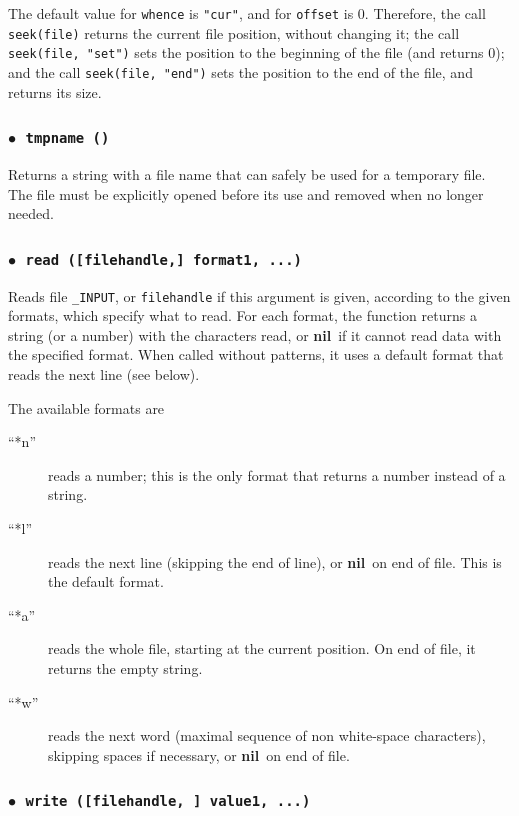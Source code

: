 \documentclass[11pt]{article}
\newcommand{\T}[1]{{\tt #1}}
\newcommand{\nil}{{\bf nil}}
\newcommand{\Deffunc}[1]{\index{#1}}
\newcommand{\ff}{$\bullet$\ }
\begin{document}
The default value for \verb|whence| is \verb|"cur"|,
and for \verb|offset| is 0.
Therefore, the call \verb|seek(file)| returns the current
file position, without changing it;
the call \verb|seek(file, "set")| sets the position to the
beginning of the file (and returns 0);
and the call \verb|seek(file, "end")| sets the position to the
end of the file, and returns its size.

\subsubsection*{\ff \T{tmpname ()}}\Deffunc{tmpname}

Returns a string with a file name that can safely
be used for a temporary file.
The file must be explicitly opened before its use
and removed when no longer needed.

\subsubsection*{\ff \T{read ([filehandle,] format1, ...)}}\Deffunc{read}

Reads file \verb|_INPUT|,
or \verb|filehandle| if this argument is given,
according to the given formats, which specify what to read.
For each format,
the function returns a string (or a number) with the characters read,
or \nil\ if it cannot read data with the specified format.
When called without patterns,
it uses a default format that reads the next line
(see below).

The available formats are
\begin{description}
\item[``*n''] reads a number;
this is the only format that returns a number instead of a string.
\item[``*l''] reads the next line
(skipping the end of line), or \nil\ on end of file.
This is the default format.
\item[``*a''] reads the whole file, starting at the current position.
On end of file, it returns the empty string.
\item[``*w''] reads the next word
(maximal sequence of non white-space characters),
skipping spaces if necessary, or \nil\ on end of file.
\end{description}

\subsubsection*{\ff \T{write ([filehandle, ] value1, ...)}}\Deffunc{write}
\end{document}
